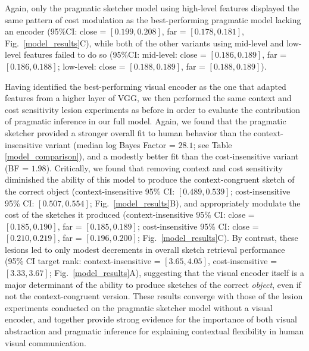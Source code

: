 \documentclass[9pt,twocolumn,twoside]{pnas-new}
\newcommand{\ndg}[1]{\textcolor{Green}{[ndg: #1]}}
\begin{document}
Again, only the pragmatic sketcher model using high-level features displayed the same pattern of cost modulation as the best-performing pragmatic model lacking an encoder (95\%CI: close = $[0.199, 0.208]$, far = $[0.178, 0.181]$, Fig.~\ref{model_results}C), while both of the other variants using mid-level and low-level features failed to do so (95\%CI: mid-level: close = $[0.186, 0.189]$, far = $[0.186, 0.188]$; low-level: close = $[0.188, 0.189]$, far = $[0.188, 0.189]$).  

Having identified the best-performing visual encoder as the one that adapted features from a higher layer of VGG, we then performed the same context and cost sensitivity lesion experiments as before in order to evaluate the contribution of pragmatic inference in our full model. 
Again, we found that the pragmatic sketcher provided a stronger overall fit to human behavior than the context-insensitive variant (median log Bayes Factor = $28.1$; see Table \ref{model_comparison}), and a modestly better fit than the cost-insensitive variant (BF = $1.98$). 
Critically, we found that removing context and cost sensitivity diminished the ability of this model to produce the context-congruent sketch of the correct object (context-insensitive 95\% CI: $[0.489, 0.539]$; cost-insensitive 95\% CI: $[0.507, 0.554]$; Fig.~\ref{model_results}B), and appropriately modulate the cost of the sketches it produced (context-insensitive 95\% CI: close = $[0.185, 0.190]$, far = $[0.185, 0.189]$; cost-insensitive 95\% CI: close = $[0.210, 0.219]$, far = $[0.196, 0.200]$; Fig.~\ref{model_results}C). 
By contrast, these lesions led to only modest decrements in overall sketch retrieval performance (95\% CI target rank: context-insensitive = $[3.65, 4.05]$, cost-insensitive = $[3.33, 3.67]$;  Fig.~\ref{model_results}A), suggesting that the visual encoder itself is a major determinant of the ability to produce sketches of the correct \textit{object}, even if not the context-congruent version.
These results converge with those of the lesion experiments conducted on the pragmatic sketcher model without a visual encoder, and together provide strong evidence for the importance of both visual abstraction and pragmatic inference for explaining contextual flexibility in human visual communication. 

\end{document}
